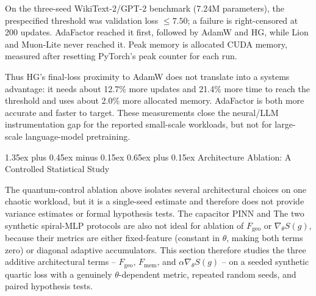 \documentclass[10pt,twocolumn]{article}
\makeatletter
\renewcommand\section{\@startsection{section}{1}{0pt}%
  {1.35ex plus 0.45ex minus 0.15ex}%
  {0.65ex plus 0.15ex}%
  {\large\bfseries}}
\makeatother
\begin{document}
On the three-seed WikiText-2/GPT-2 benchmark (7.24M parameters), the
prespecified threshold was validation loss $\le7.50$; a failure is
right-censored at 200 updates. AdaFactor reached it first, followed by AdamW
and HG, while Lion and Muon-Lite never reached it. Peak memory is allocated
CUDA memory, measured after resetting PyTorch's peak counter for each run.

\begin{table}[t]
\centering\scriptsize
{}
\caption{Compute-normalized WikiText-2 results. $^\dagger$Means among
successful runs; all timings use CUDA synchronization. Identical
initialization and minibatch streams are used within seed.}
\label{tab:llm-compute}
\end{table}

Thus HG's final-loss proximity to AdamW does not translate into a systems
advantage: it needs about 12.7\% more updates and 21.4\% more time to reach
the threshold and uses about 2.0\% more allocated memory. AdaFactor is both
more accurate and faster to target. These measurements close the neural/LLM
instrumentation gap for the reported small-scale workloads, but not for
large-scale language-model pretraining.

\section{Architecture Ablation: A Controlled Statistical Study}
\label{sec:architecture-ablation}

The quantum-control ablation above isolates several architectural choices on
one chaotic workload, but it is a single-seed estimate and therefore does not
provide variance estimates or formal hypothesis tests. The capacitor PINN and
The two synthetic spiral-MLP protocols are also not ideal for ablation of
$F_{\mathrm{geo}}$ or $\nabla_\theta S(g)$, because their metrics are either
fixed-feature (constant in $\theta$, making both terms zero) or diagonal
adaptive accumulators. This section therefore studies the three additive
architectural terms -- $F_{\mathrm{geo}}$, $F_{\mathrm{mem}}$, and
$\alpha\nabla_\theta S(g)$ -- on a seeded synthetic quartic loss with a
genuinely $\theta$-dependent metric, repeated random seeds, and paired
hypothesis tests.
\end{document}
